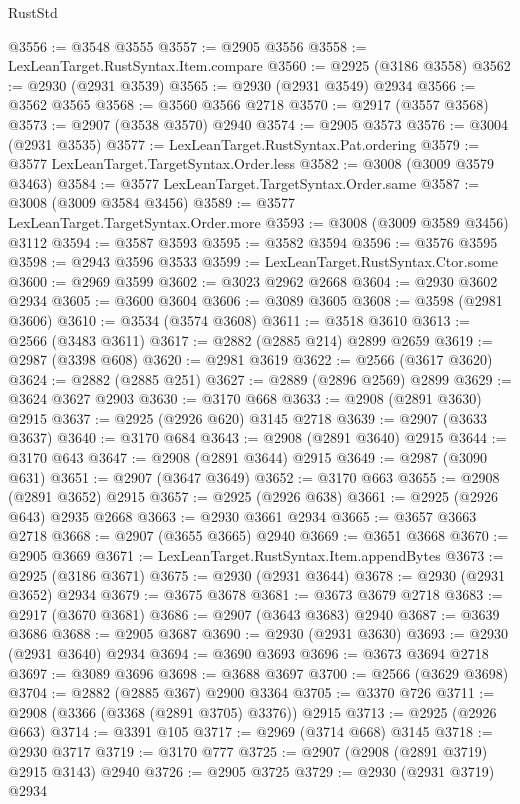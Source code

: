 \begin{lexlean}{RustStd}
\begin{coremodule}
@3556 := @3548 @3555
@3557 := @2905 @3556
@3558 := LexLeanTarget.RustSyntax.Item.compare
@3560 := @2925 (@3186 @3558)
@3562 := @2930 (@2931 @3539)
@3565 := @2930 (@2931 @3549) @2934
@3566 := @3562 @3565
@3568 := @3560 @3566 @2718
@3570 := @2917 (@3557 @3568)
@3573 := @2907 (@3538 @3570) @2940
@3574 := @2905 @3573
@3576 := @3004 (@2931 @3535)
@3577 := LexLeanTarget.RustSyntax.Pat.ordering
@3579 := @3577 LexLeanTarget.TargetSyntax.Order.less
@3582 := @3008 (@3009 @3579 @3463)
@3584 := @3577 LexLeanTarget.TargetSyntax.Order.same
@3587 := @3008 (@3009 @3584 @3456)
@3589 := @3577 LexLeanTarget.TargetSyntax.Order.more
@3593 := @3008 (@3009 @3589 @3456) @3112
@3594 := @3587 @3593
@3595 := @3582 @3594
@3596 := @3576 @3595
@3598 := @2943 @3596 @3533
@3599 := LexLeanTarget.RustSyntax.Ctor.some
@3600 := @2969 @3599
@3602 := @3023 @2962 @2668
@3604 := @2930 @3602 @2934
@3605 := @3600 @3604
@3606 := @3089 @3605
@3608 := @3598 (@2981 @3606)
@3610 := @3534 (@3574 @3608)
@3611 := @3518 @3610
@3613 := @2566 (@3483 @3611)
@3617 := @2882 (@2885 @214) @2899 @2659
@3619 := @2987 (@3398 @608)
@3620 := @2981 @3619
@3622 := @2566 (@3617 @3620)
@3624 := @2882 (@2885 @251)
@3627 := @2889 (@2896 @2569) @2899
@3629 := @3624 @3627 @2903
@3630 := @3170 @668
@3633 := @2908 (@2891 @3630) @2915
@3637 := @2925 (@2926 @620) @3145 @2718
@3639 := @2907 (@3633 @3637)
@3640 := @3170 @684
@3643 := @2908 (@2891 @3640) @2915
@3644 := @3170 @643
@3647 := @2908 (@2891 @3644) @2915
@3649 := @2987 (@3090 @631)
@3651 := @2907 (@3647 @3649)
@3652 := @3170 @663
@3655 := @2908 (@2891 @3652) @2915
@3657 := @2925 (@2926 @638)
@3661 := @2925 (@2926 @643) @2935 @2668
@3663 := @2930 @3661 @2934
@3665 := @3657 @3663 @2718
@3668 := @2907 (@3655 @3665) @2940
@3669 := @3651 @3668
@3670 := @2905 @3669
@3671 := LexLeanTarget.RustSyntax.Item.appendBytes
@3673 := @2925 (@3186 @3671)
@3675 := @2930 (@2931 @3644)
@3678 := @2930 (@2931 @3652) @2934
@3679 := @3675 @3678
@3681 := @3673 @3679 @2718
@3683 := @2917 (@3670 @3681)
@3686 := @2907 (@3643 @3683) @2940
@3687 := @3639 @3686
@3688 := @2905 @3687
@3690 := @2930 (@2931 @3630)
@3693 := @2930 (@2931 @3640) @2934
@3694 := @3690 @3693
@3696 := @3673 @3694 @2718
@3697 := @3089 @3696
@3698 := @3688 @3697
@3700 := @2566 (@3629 @3698)
@3704 := @2882 (@2885 @367) @2900 @3364
@3705 := @3370 @726
@3711 := @2908 (@3366 (@3368 (@2891 @3705) @3376)) @2915
@3713 := @2925 (@2926 @663)
@3714 := @3391 @105
@3717 := @2969 (@3714 @668) @3145
@3718 := @2930 @3717
@3719 := @3170 @777
@3725 := @2907 (@2908 (@2891 @3719) @2915 @3143) @2940
@3726 := @2905 @3725
@3729 := @2930 (@2931 @3719) @2934

\end{coremodule}
\end{lexlean}
